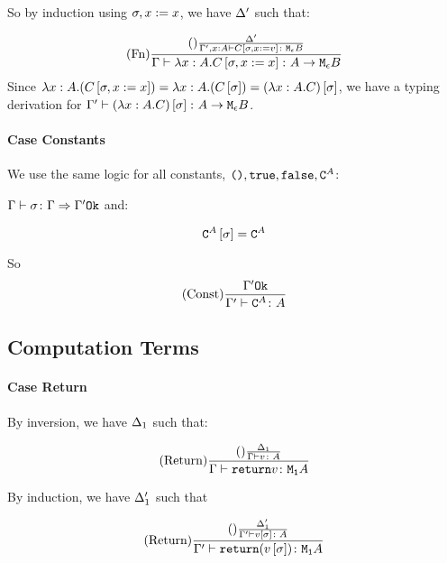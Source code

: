 {        So by induction using $\sigma,x:= x$, we have $\Delta'$ such that:

        \begin{equation}
            (\text{Fn}) \frac{
                (\text{}) \frac{\Delta'}{\Gamma', x:A  \vdash C\left[\sigma, x:= v\right] \colon \texttt{M}_{\epsilon}{B}}
            }{\Gamma \vdash \lambda x : A. C\left[\sigma, x:={x}\right] \colon A \rightarrow \texttt{M}_{\epsilon}{B}}
        \end{equation} 
        Since $\lambda x : A. (C\left[\sigma, x:={x}\right]) = {\lambda x : A. ({C\left[\sigma\right]})} = (\lambda x : A. C)\left[\sigma\right]$, we have a typing derivation for $\Gamma' \vdash (\lambda x : A. C)\left[\sigma\right] \colon A \rightarrow \texttt{M}_{\epsilon}{B}$.

    \paragraph{Case Constants}
        We use the same logic for all constants, $\texttt{()},\texttt{true},\texttt{false},\texttt{C}^{A}$:

        $\Gamma \vdash \sigma \colon \Gamma \Rightarrow \Gamma' \texttt{Ok}$ and:

        \begin{equation}
            \texttt{C}^{A}\left[\sigma\right] =\texttt{C}^{A}
        \end{equation}

        So \begin{equation}
            (\text{Const}) \frac{\Gamma' \texttt{Ok}}{\Gamma' \vdash \texttt{C}^{A} \colon A}
        \end{equation}
    \subsection{Computation Terms}
    \paragraph{Case Return}
        By inversion, we have $\Delta_1$ such that:

        \begin{equation}
            (\text{Return}) \frac{(\text{}) \frac{\Delta_1}{\Gamma \vdash v \colon A}}{\Gamma \vdash \texttt{return} v \colon \texttt{M}_{\texttt{1}}{A}}
        \end{equation}

        By induction, we have $\Delta_1'$ such that

        \begin{equation}
            (\text{Return}) \frac{(\text{}) \frac{\Delta'_1}{\Gamma' \vdash v\left[\sigma\right] \colon A}}{\Gamma' \vdash \texttt{return} (v\left[\sigma\right]) \colon \texttt{M}_{\texttt{1}}{A}}
        \end{equation}

}
